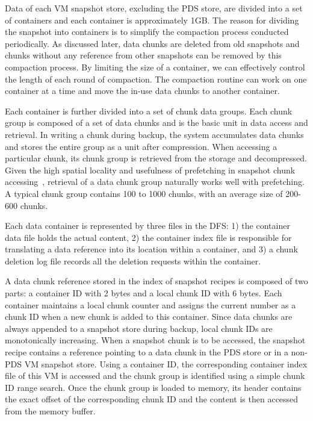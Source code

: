 Data of each VM snapshot store, excluding the PDS store, are divided into a set of containers and 
each container is approximately 1GB. 
The reason for dividing the snapshot into containers is to simplify the compaction process
conducted periodically. As discussed later, data chunks are deleted from old snapshots
and chunks without any reference from other snapshots can be removed by this compaction process.
By limiting the size of a container, we can effectively control the length of each round of compaction.
The compaction  routine can work on one container at a time and move the in-use data chunks to another container. 

Each container is further divided into a set of chunk data groups. Each chunk group is composed of
a set of data chunks and is the basic unit in data access and retrieval. 
In writing a chunk during backup, the system accumulates data chunks and stores the entire
group as a unit after compression.
When accessing a particular chunk, its chunk group is retrieved from the storage
and decompressed. Given the high spatial locality and usefulness of prefetching  in 
snapshot chunk accessing~\cite{Guo2011,foundation08},
retrieval of  a data chunk  group naturally works well with prefetching. 
A  typical chunk group contains 100 to 1000 chunks, with an average size of 
200-600 chunks.

Each data container is represented by three files in the DFS:
1) the container data file holds the actual content, 
2) the container index file is responsible for translating a data reference
into its location within a container, and 
3) a chunk deletion log file records all the deletion requests within  the container.

A data chunk reference stored in the index of snapshot recipes
is composed of two parts: a container ID with 2 bytes and a local chunk ID with 6 bytes.
Each container maintains a local  chunk counter and assigns the current number 
as a chunk ID  when  a new chunk is added to this  container. 
Since data chunks are always appended to a snapshot store during backup, 
local chunk IDs are monotonically increasing.
When a snapshot chunk is to be accessed, the snapshot recipe contains a reference pointing to  a data chunk
in the PDS store or in a non-PDS VM snapshot  store. 
Using  a container ID, the corresponding container index file of this VM is accessed and 
the chunk group is identified using a simple chunk ID range search. Once the chunk group is loaded to memory, 
its header contains the exact offset of the corresponding chunk ID and the content is then accessed from the memory buffer.

